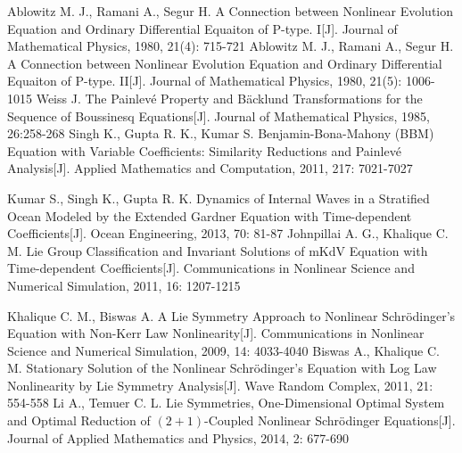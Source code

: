 \begin{thebibliography}{0}
 Ablowitz M. J., Ramani A., Segur H. A Connection between Nonlinear Evolution Equation and Ordinary Differential Equaiton of P-type. I[J]. Journal of Mathematical Physics, 1980, 21(4): 715-721
 Ablowitz M. J., Ramani A., Segur H. A Connection between Nonlinear Evolution Equation and Ordinary Differential Equaiton of P-type. II[J]. Journal of Mathematical Physics, 1980, 21(5): 1006-1015
 Weiss J. The Painlev\'{e} Property and B\"{a}cklund Transformations for the Sequence of Boussinesq Equations[J]. Journal of Mathematical Physics, 1985, 26:258-268
 Singh K., Gupta R. K., Kumar S. Benjamin-Bona-Mahony (BBM) Equation with Variable Coefficients: Similarity Reductions and Painlev\'{e} Analysis[J]. Applied Mathematics and Computation, 2011, 217: 7021-7027

 Kumar S., Singh K., Gupta R. K. Dynamics of Internal Waves in a Stratified Ocean Modeled by the Extended Gardner Equation with Time-dependent Coefficients[J]. Ocean Engineering, 2013, 70: 81-87%
     Johnpillai A. G., Khalique C. M. Lie Group Classification and Invariant Solutions of mKdV Equation with Time-dependent Coefficients[J]. Communications in Nonlinear Science and Numerical Simulation, 2011, 16: 1207-1215


 Khalique C. M., Biswas A. A Lie Symmetry Approach to Nonlinear Schr\"{o}dinger's Equation with Non-Kerr Law Nonlinearity[J]. Communications in Nonlinear Science and Numerical Simulation, 2009, 14: 4033-4040
 Biswas A., Khalique C. M. Stationary Solution of the Nonlinear Schr\"{o}dinger's Equation with Log Law Nonlinearity by Lie Symmetry Analysis[J]. Wave Random Complex, 2011, 21: 554-558
 Li A., Temuer C. L. Lie Symmetries, One-Dimensional Optimal System and Optimal Reduction of $(2+1)$-Coupled Nonlinear Schr\"{o}dinger Equations[J]. Journal of Applied Mathematics and Physics, 2014, 2: 677-690


\end{thebibliography}
